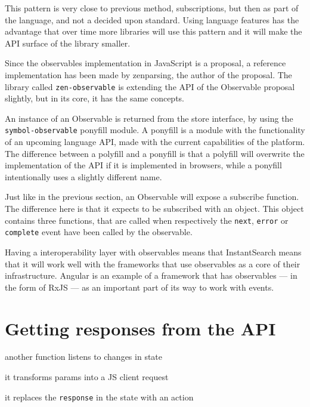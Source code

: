 This pattern is very close to previous method, subscriptions, but then as part of the language, and not a decided upon standard. Using language features has the advantage that over time more libraries will use this pattern and it will make the API surface of the library smaller.

Since the observables implementation in JavaScript is a proposal, a reference implementation has been made by zenparsing, the author of the proposal. The library called {\tt zen-observable}\cite{zenparsing-observable} is extending the API of the Observable proposal slightly, but in its core, it has the same concepts.

An instance of an Observable is returned from the store interface, by using the {\tt symbol-observable}\cite{symbol-observable} ponyfill module. A ponyfill\cite{ponyfill} is a module with the functionality of an upcoming language API, made with the current capabilities of the platform. The difference between a polyfill and a ponyfill is that a polyfill will overwrite the implementation of the API if it is implemented in browsers, while a ponyfill intentionally uses a slightly different name.

Just like in the previous section, an Observable will expose a subscribe function. The difference here is that it expects to be subscribed with an object. This object contains three functions, that are called when respectively the {\tt next}, {\tt error} or {\tt complete} event have been called by the observable.

Having a interoperability layer with observables means that InstantSearch means that it will work well with the frameworks that use observables as a core of their infrastructure. Angular is an example of a framework that has observables --- in the form of RxJS\cite{angular-rx} --- as an important part of its way to work with events.



\section{Getting responses from the API} %
\label{sec:getting_responses_from_the_api}

another function listens to changes in state %

it transforms params into a JS client request

it replaces the {\tt response} in the state with an action

